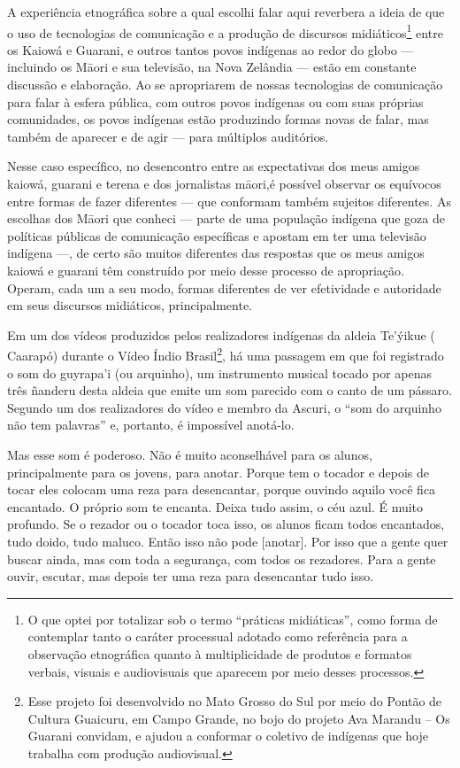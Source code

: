 A experiência etnográfica sobre a qual escolhi falar aqui reverbera a
ideia de que o uso de tecnologias de comunicação e a produção de
discursos midiáticos\footnote{O que optei por totalizar sob o termo
``práticas midiáticas'', como forma de contemplar tanto o caráter
processual adotado como referência para a observação etnográfica quanto
à multiplicidade de produtos e formatos verbais, visuais e audiovisuais
que aparecem por meio desses processos.} entre os Kaiowá e Guarani, e
outros tantos povos indígenas ao redor do globo --- incluindo os M\=aori
e sua televisão, na Nova Zelândia --- estão em constante discussão e
elaboração. Ao se apropriarem de nossas tecnologias de comunicação para
falar à esfera pública, com outros povos indígenas ou com suas próprias
comunidades, os povos indígenas estão produzindo formas novas de falar,
mas também de aparecer e de agir --- para múltiplos auditórios.

Nesse caso específico, no desencontro entre as expectativas dos meus
amigos kaiowá, guarani e terena e dos jornalistas m\=aori,é possível observar os
equívocos entre formas de fazer diferentes --- que conformam também
sujeitos diferentes. As escolhas dos M\=aori que conheci --- parte de uma
população indígena que goza de políticas públicas de comunicação
específicas e apostam em ter uma televisão indígena ---, de certo são
muitos diferentes das respostas que os meus amigos kaiowá e guarani têm
construído por meio desse processo de apropriação. Operam, cada um a
seu modo, formas diferentes de ver efetividade e autoridade em seus
discursos midiáticos, principalmente.

Em um dos vídeos produzidos pelos realizadores indígenas da aldeia
Te’ýikue ( Caarapó) durante o Vídeo Índio Brasil\footnote{Esse
projeto foi desenvolvido no Mato Grosso do Sul por meio do Pontão de
Cultura Guaicuru, em Campo Grande, no bojo do projeto Ava Marandu – Os
Guarani convidam, e ajudou a conformar o coletivo de indígenas que hoje
trabalha com produção audiovisual.  }, há uma passagem em que foi
registrado o som do guyrapa’i (ou arquinho), um instrumento musical
tocado por apenas três ñanderu desta aldeia que emite um som parecido
com o canto de um pássaro. Segundo um dos realizadores do vídeo e
membro da Ascuri, o ``som do arquinho não tem palavras'' e, portanto, é
impossível anotá-lo.

Mas esse som é poderoso. Não é muito aconselhável para os alunos,
principalmente para os jovens, para anotar. Porque tem o tocador e
depois de tocar eles colocam uma reza para desencantar, porque ouvindo
aquilo você fica encantado. O próprio som te encanta. Deixa tudo assim,
o céu azul. É muito profundo. Se o rezador ou o tocador toca isso, os
alunos ficam todos encantados, tudo doido, tudo maluco. Então isso não
pode [anotar]. Por isso que a gente quer buscar ainda, mas com toda a
segurança, com todos os rezadores. Para a gente ouvir, escutar, mas
depois ter uma reza para desencantar tudo isso.

